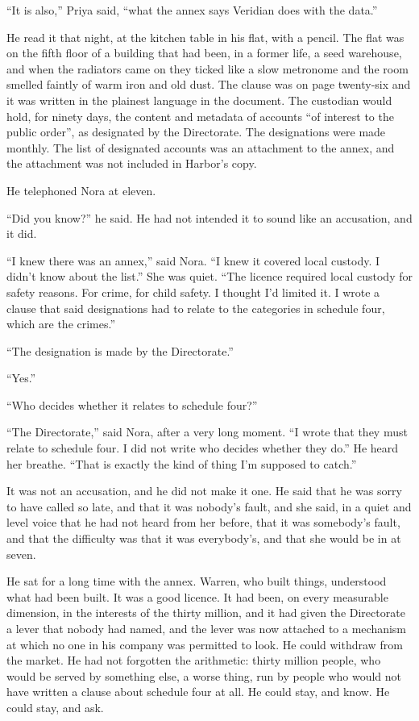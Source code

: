 ``It is also,'' Priya said, ``what the annex says Veridian does with the data.''

He read it that night, at the kitchen table in his flat, with a pencil. The flat was on the fifth floor of a building that had been, in a former life, a seed warehouse, and when the radiators came on they ticked like a slow metronome and the room smelled faintly of warm iron and old dust. The clause was on page twenty-six and it was written in the plainest language in the document. The custodian would hold, for ninety days, the content and metadata of accounts ``of interest to the public order'', as designated by the Directorate. The designations were made monthly. The list of designated accounts was an attachment to the annex, and the attachment was not included in Harbor's copy.

He telephoned Nora at eleven.

``Did you know?'' he said. He had not intended it to sound like an accusation, and it did.

``I knew there was an annex,'' said Nora. ``I knew it covered local custody. I didn't know about the list.'' She was quiet. ``The licence required local custody for safety reasons. For crime, for child safety. I thought I'd limited it. I wrote a clause that said designations had to relate to the categories in schedule four, which are the crimes.''

``The designation is made by the Directorate.''

``Yes.''

``Who decides whether it relates to schedule four?''

``The Directorate,'' said Nora, after a very long moment. ``I wrote that they must relate to schedule four. I did not write who decides whether they do.'' He heard her breathe. ``That is exactly the kind of thing I'm supposed to catch.''

It was not an accusation, and he did not make it one. He said that he was sorry to have called so late, and that it was nobody's fault, and she said, in a quiet and level voice that he had not heard from her before, that it was somebody's fault, and that the difficulty was that it was everybody's, and that she would be in at seven.

He sat for a long time with the annex. Warren, who built things, understood what had been built. It was a good licence. It had been, on every measurable dimension, in the interests of the thirty million, and it had given the Directorate a lever that nobody had named, and the lever was now attached to a mechanism at which no one in his company was permitted to look. He could withdraw from the market. He had not forgotten the arithmetic: thirty million people, who would be served by something else, a worse thing, run by people who would not have written a clause about schedule four at all. He could stay, and know. He could stay, and ask.

